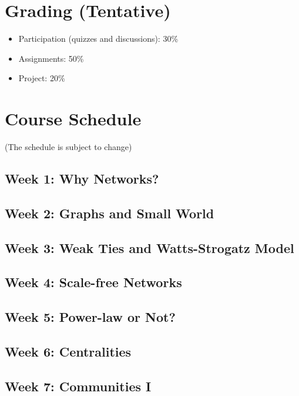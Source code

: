 \documentclass[11pt,article,oneside]{memoir}
\begin{document}
\section{Grading (Tentative)}
\label{sec:grading_tentative_}

\begin{itemize}

\item Participation (quizzes and discussions): 30\%

\item Assignments: 50\%

\item Project: 20\%


\end{itemize}

\section{Course Schedule}

(The schedule is subject to change)

\subsection{Week 1:  Why Networks?}
\subsection{Week 2:  Graphs and Small World}
\subsection{Week 3:  Weak Ties and Watts-Strogatz Model}
\subsection{Week 4:  Scale-free Networks}
\subsection{Week 5:  Power-law or Not?}
\subsection{Week 6:  Centralities} 
\subsection{Week 7:  Communities I}
\end{document}

